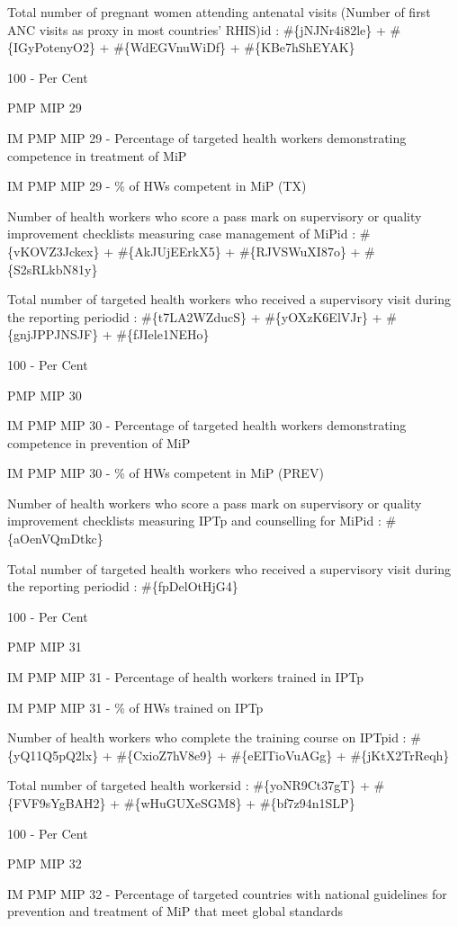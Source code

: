 \documentclass[]{book}
\begin{document}
Total number of pregnant women attending antenatal visits (Number of first ANC visits as proxy in most countries' RHIS)id : \#\{jNJNr4i82le\} + \#\{IGyPotenyO2\} + \#\{WdEGVnuWiDf\} + \#\{KBe7hShEYAK\}

100 - Per Cent

PMP MIP 29

IM PMP MIP 29 - Percentage of targeted health workers demonstrating competence in treatment of MiP

IM PMP MIP 29 - \% of HWs competent in MiP (TX)

Number of health workers who score a pass mark on supervisory or quality improvement checklists measuring case management of MiPid : \#\{vKOVZ3Jckex\} + \#\{AkJUjEErkX5\} + \#\{RJVSWuXI87o\} + \#\{S2sRLkbN81y\}

Total number of targeted health workers who received a supervisory visit during the reporting periodid : \#\{t7LA2WZducS\} + \#\{yOXzK6ElVJr\} + \#\{gnjJPPJNSJF\} + \#\{fJIele1NEHo\}

100 - Per Cent

PMP MIP 30

IM PMP MIP 30 - Percentage of targeted health workers demonstrating competence in prevention of MiP

IM PMP MIP 30 - \% of HWs competent in MiP (PREV)

Number of health workers who score a pass mark on supervisory or quality improvement checklists measuring IPTp and counselling for MiPid : \#\{aOenVQmDtkc\}

Total number of targeted health workers who received a supervisory visit during the reporting periodid : \#\{fpDelOtHjG4\}

100 - Per Cent

PMP MIP 31

IM PMP MIP 31 - Percentage of health workers trained in IPTp

IM PMP MIP 31 - \% of HWs trained on IPTp

Number of health workers who complete the training course on IPTpid : \#\{yQ11Q5pQ2lx\} + \#\{CxioZ7hV8e9\} + \#\{eEITioVuAGg\} + \#\{jKtX2TrReqh\}

Total number of targeted health workersid : \#\{yoNR9Ct37gT\} + \#\{FVF9sYgBAH2\} + \#\{wHuGUXeSGM8\} + \#\{bf7z94n1SLP\}

100 - Per Cent

PMP MIP 32

IM PMP MIP 32 - Percentage of targeted countries with national guidelines for prevention and treatment of MiP that meet global standards
\end{document}
